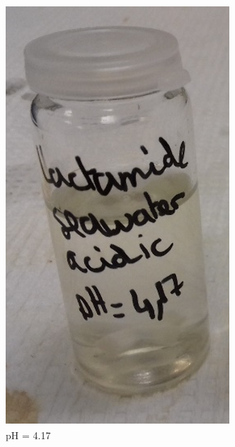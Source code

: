 \begin{figure}
     \begin{subfigure}[b]{0.3\textwidth}
         \centering
         \includegraphics[width=\textwidth]{img/fig/ph1.png}
         \caption{pH = 4.17}
     \end{subfigure}
     \hfill
     \begin{subfigure}[b]{0.28\textwidth}

\end{subfigure}
\end{figure}
